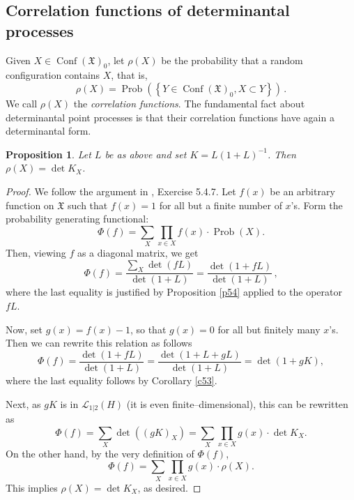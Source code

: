 \documentclass[12pt]{amsart}
\newcommand{\Prob}{\operatorname{Prob}}
\newcommand{\Conf}{\operatorname{Conf}}
\newcommand{\CX}{\Conf(\X)}
\newcommand{\CXf}{\CX_0}
\newcommand{\X}{\mathfrak{X}}
\newcommand{\LH}{\mathcal{L}_{1|2}(H)}
\theoremstyle{plain}
\newtheorem{proposition}[lemma]{Proposition}
\theoremstyle{definition}
\numberwithin{equation}{section}
\begin{document}
\subsection{Correlation functions of determinantal processes}

Given $X\in\CXf$, let $\rho(X)$ be the probability that a 
random configuration  contains $X$, that is,
$$
\rho(X)=\Prob\left(\left\{Y\in\CXf, X\subset Y\right\}\right)\,.
$$
We call $\rho(X)$ the \emph{correlation functions}. The fundamental
fact about determinantal point processes is that their
correlation functions have again a determinantal form. 

\begin{proposition}\label{p55} Let $L$ be as above and set $K=L(1+L)^{-1}$. 
Then $\rho(X)=\det K_X$. 
\end{proposition}

\begin{proof} We follow the argument in \cite{DVJ}, Exercise 5.4.7.  Let $f(x)$ be an arbitrary function on $\X$ such that $f(x)=1$ for all but a finite number of $x$'s. Form the probability generating functional:
%
\begin{equation*}
\Phi(f)=\sum_X \prod_{x\in X}f(x)\cdot \Prob(X).
\end{equation*}
%
Then, viewing $f$ as a diagonal matrix, we get
%
\begin{equation*}
\Phi(f)=\frac{\sum_X\det(fL)}{\det(1+L)}
=\frac{\det(1+fL)}{\det(1+L)}\,, 
\end{equation*}
%
where the last equality is justified by Proposition \ref{p54} applied to the operator $fL$.

Now, set $g(x)=f(x)-1$, so that $g(x)=0$ for all but finitely many $x$'s. Then 
we can rewrite this relation as follows
%
\begin{equation*}
\Phi(f)= \frac{\det(1+fL)}{\det(1+L)}=\frac{\det(1+L+gL)}{\det(1+L)}
=\det(1+gK),
\end{equation*}
%
where the last equality follows by Corollary \ref{c53}.

Next, as $gK$ is in $\LH$ (it is even finite--dimensional), this can be rewritten as
%
\begin{equation*}
\Phi(f)=\sum_X\det((gK)_X)=\sum_X\prod_{x\in X}g(x)\cdot\det K_X.
\end{equation*}
%
On the other hand, by the very definition of $\Phi(f)$,
%
\begin{equation*}
\Phi(f)=\sum_X \prod_{x\in X}g(x)\cdot\rho(X).
\end{equation*}
%
This implies $\rho(X)=\det K_X$, as desired. 
\end{proof}
\end{document}
